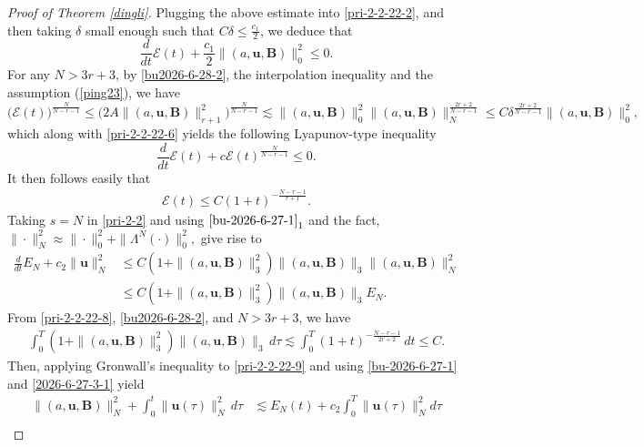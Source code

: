 \documentclass[10pt,a4paper]{amsart}
\def\b{ \mathbf{B} }
\def\u{ \mathbf{u} }
\begin{document}
\begin{proof}[Proof of Theorem \ref{dingli}]
Plugging the above estimate  into \eqref{pri-2-2-22-2}, and then taking $\delta$ small enough such that $C\delta\leq\frac{c_1}{2}$,  we  deduce that
\begin{equation}\label{pri-2-2-22-6}
\frac{d}{dt}{\mathcal{E}(t)}+\frac{c_1}{2}\|(a,\u,\b)\|_{0}^2\leq0.
\end{equation}
For any ${N}> 3r+3$, by \eqref{bu2026-6-28-2}, the interpolation inequality and the  assumption (\ref{ping23}),  we have
\begin{equation*}%
 \big(\mathcal{E}(t)\big)^{\frac{N}{N-r-1}}\leq \big(2A\|(a,\u,\b)\|^2_{r+1}\big)^{\frac{N}{N-r-1}}\lesssim\|(a,\u,\b)\|_{0}^{2}\|(a,\u,\b)\|_{N}^{\frac{2r+2}{N-r-1}}
\leq C\delta^{\frac{2r+2}{N-r-1}}\|(a,\u,\b)\|_{0}^{2},
\end{equation*}
which along with \eqref{pri-2-2-22-6} yields the following Lyapunov-type inequality
\begin{equation*}%
\frac{d}{dt}{\mathcal{E}(t)}+c\mathcal{E}(t)^{\frac{N}{N-r-1}}\leq0.
\end{equation*}
It then follows easily that
\begin{align}\label{pri-2-2-22-8}
{\mathcal{E}(t)}\le C(1+t)^{-\frac{N-r-1}{r+1}}.
\end{align}
Taking $s={N}$ in \eqref{pri-2-2} and using $\eqref{bu-2026-6-27-1}_1$ and the fact, $\|\cdot\|^2_{N}\approx\|\cdot\|^2_{0}+\|\Lambda^N(\cdot)\|^2_{0},$ give rise to
\begin{equation}\label{pri-2-2-22-9}
\begin{split}
\frac{d}{dt}E_{N}+c_2\|\u\|_{N}^2&\leq C(1+\|(a,\u,\b)\|^2_3)\|(a,\u,\b)\|_3\|(a,\u,\b)\|^2_{N}\\
&\leq C(1+\|(a,\u,\b)\|^2_3)\|(a,\u,\b)\|_3E_{N}.
\end{split}\end{equation}
From \eqref{pri-2-2-22-8}, \eqref{bu2026-6-28-2}, and $N>3r+3$, we have
\begin{align*}
\int_0^T(1+\|(a,\u,\b)\|^2_3)\|(a,\u,\b)\|_3\,d\tau\lesssim\int_0^T(1+t)^{-\frac{N-r-1}{2r+2}}\,dt\le C.
\end{align*}
Then, applying Gronwall's inequality to \eqref{pri-2-2-22-9} and using \eqref{bu-2026-6-27-1} and \eqref{2026-6-27-3-1} yield
\begin{equation}\begin{split}\label{bu-pri-2-2-22-10}
\big\|(a,\u,\b)\big\|^2_{N}+\int_0^t\|\u(\tau)\|_{N}^2\,d\tau&\lesssim E_{N}(t)+c_2\int_0^T\|\u(\tau)\|_{N}^2d\tau\\

\end{split}
\end{equation}
\end{proof}
\end{document}
